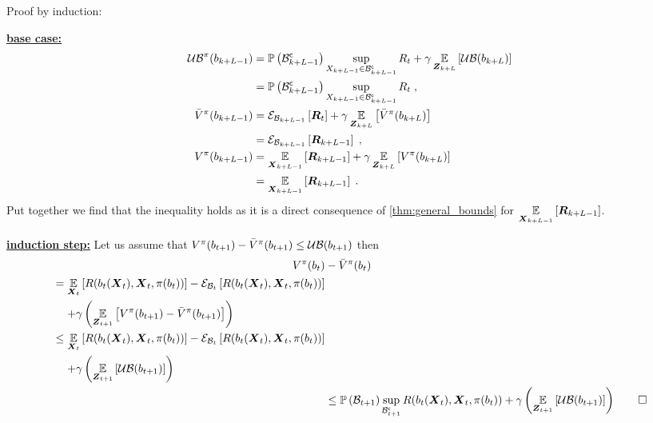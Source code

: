 \begin{proofE}
	Proof by induction:

	\textbf{\underline{base case:}}
	\begin{align*}
		\upperbound\nolimits^\pi(\blf{k+L-1})&=\measure{\stcompI{\subSpace}{k+L-1}}\sup_{\states{k+L-1}\in\stcompI{\subSpace}{k+L-1}}R_t+\gamma\expectation{\upperbound(\blf{k+L})}{\observationsRV{k+L}}\\
		&=\measure{\stcompI{\subSpace}{k+L-1}}\sup_{\states{k+L-1}\in\stcompI{\subSpace}{k+L-1}}R_t\;,\\
		\bar{V}^\pi(\blf{k+L-1}) & =\partialexpectation{\boldsymbol{R}_t}{\subSpaceI{k+L-1}}
		+\gamma\expectation{\bar{V}^\pi(\blf{k+L})}{\observationsRV{k+L}}\\
		&=\partialexpectation{\boldsymbol{R}_{k+L-1}}{\subSpaceI{k+L-1}}\;,\\
		V^\pi(\blf{k+L-1})&=\expectation{\boldsymbol{R}_{k+L-1}}{\statesRV{k+L-1}}
		+\gamma\expectation{V^\pi(\blf{k+L})}{\observationsRV{k+L}}\\
		&=\expectation{\boldsymbol{R}_{k+L-1}}{\statesRV{k+L-1}}\;.
	\end{align*}
	Put together we find that the inequality holds as it is a direct consequence of \cref{thm:general_bounds} for $\expectation{\boldsymbol{R}_{k+L-1}}{\statesRV{k+L-1}}$.

	\textbf{\underline{induction step:}}
	Let us assume that $V^\pi(\blf{t+1})-\bar{V}^\pi(\blf{t+1})\leq\upperbound(\blf{t+1})$ then
	\begin{align*}
		V^\pi(\blf{t})&-\bar{V}^\pi(\blf{t})\\
		\begin{split}
			&=\expectation{R(\blf{t}(\statesRV{t}),\statesRV{t},\pi(\blf{t}))}{\statesRV{t}}-\partialexpectation{R(\blf{t}(\statesRV{t}),\statesRV{t},\pi(\blf{t}))}{\subSpaceI{t}} \\
			&\phantomeq+\gamma\left(\expectation{V^\pi(\blf{t+1})-\bar{V}^\pi(\blf{t+1})}{\observationsRV{t+1}}\right)
		\end{split}    \\
		\begin{split}
			&\leq\expectation{R(\blf{t}(\statesRV{t}),\statesRV{t},\pi(\blf{t}))}{\statesRV{t}}-\partialexpectation{R(\blf{t}(\statesRV{t}),\statesRV{t},\pi(\blf{t}))}{\subSpaceI{t}} \\
			&\phantomeq+\gamma\left(\expectation{\upperbound(\blf{t+1})}{\observationsRV{t+1}}\right)
		\end{split} \\
		&\leq\measure{\subSpaceI{t+1}}\sup_{\stcompI{\subSpace}{t+1}}R(\blf{t}(\statesRV{t}),\statesRV{t},\pi(\blf{t}))+\gamma\left(\expectation{\upperbound(\blf{t+1})}{\observationsRV{t+1}}\right)\qed
	\end{align*}
\end{proofE}

